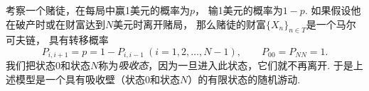 \begin{example}
考察一个赌徒，在每局中赢1美元的概率为\(p\)，
输1美元的概率为\(1-p\).
如果假设他在破产时或在财富达到\(N\)美元时离开赌局，
那么赌徒的财富\(\{X_n\}_{n \in T}\)是一个马尔可夫链，
具有转移概率\begin{equation*}
	P_{i,i+1} = p = 1 - P_{i,i-1}
	\ (i=1,2,\dotsc,N-1),
	\qquad
	P_{00} = P_{NN} = 1.
\end{equation*}
我们把状态\(0\)和状态\(N\)称为\emph{吸收态}，因为一旦进入此状态，它们就不再离开.
于是上述模型是一个具有吸收壁（状态\(0\)和状态\(N\)）的有限状态的随机游动.
\end{example}
